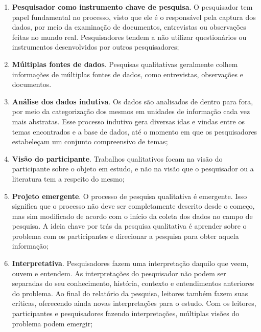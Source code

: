 \begin{enumerate}
  
  \item \textbf{Pesquisador como instrumento chave de pesquisa}. O pesquisador
  tem papel fundamental no processo, visto que ele é o responsável pela captura dos
  dados, por meio da examinação de documentos, entrevistas ou observações feitas
  no mundo real. Pesquisadores tendem a não utilizar questionários ou
  instrumentos desenvolvidos por outros pesquisadores;
  
  \item \textbf{Múltiplas fontes de dados}. Pesquisas qualitativas geralmente
  colhem informações de múltiplas fontes de dados, como entrevistas,
  observações e documentos.
  
  \item \textbf{Análise dos dados indutiva}. Os dados são analisados de dentro
  para fora, por meio da categorização dos mesmos em unidades de informação cada
  vez mais abstratas. Esse processo indutivo gera diversas idas e vindas entre
  os temas encontrados e a base de dados, até o momento em que os pesquisadores
  estabeleçam um conjunto compreensivo de temas;
  
  \item \textbf{Visão do participante}. Trabalhos qualitativos focam na visão do
  participante sobre o objeto em estudo, e não na visão que o pesquisador ou a
  literatura tem a respeito do mesmo;
  
  \item \textbf{Projeto emergente}. O processo de pesquisa qualitativa é
  emergente. Isso significa que o processo não deve ser completamente descrito
  desde o começo, mas sim modificado de acordo com o início da coleta dos dados
  no campo de pesquisa. A ideia chave por trás da pesquisa qualitativa é
  aprender sobre o problema com os participantes e direcionar a pesquisa para
  obter aquela informação;
  
  \item \textbf{Interpretativa}. Pesquisadores fazem uma interpretação daquilo
  que veem, ouvem e entendem. As interpretações do pesquisador não podem ser
  separadas do seu conhecimento, história, contexto e entendimentos anteriores
  do problema. Ao final do relatório da pesquisa, leitores também fazem suas
  críticas, oferecendo ainda novas interpretações para o estudo. Com os
  leitores, participantes e pesquisadores fazendo interpretações, múltiplas
  visões do problema podem emergir;
  
\end{enumerate} 

